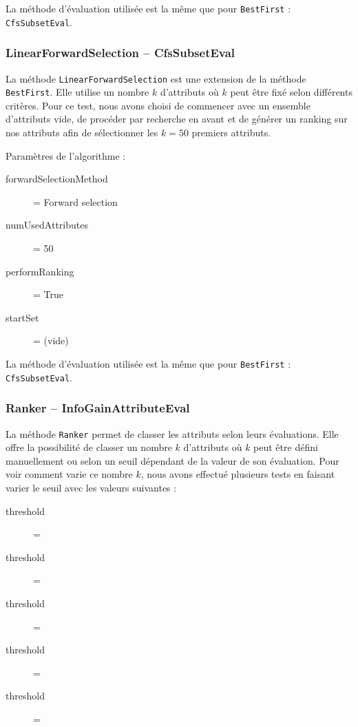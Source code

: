 La méthode d'évaluation utilisée est la même que pour \texttt{BestFirst} : \texttt{CfsSubsetEval}.

\subsubsection{LinearForwardSelection -- CfsSubsetEval}

La méthode \texttt{LinearForwardSelection} est une extension de la méthode \texttt{BestFirst}. Elle utilise un nombre $k$ d'attributs où $k$ peut être fixé selon différents critères. Pour ce test, nous avons choisi de commencer avec un ensemble d'attributs vide, de procéder par recherche en avant et de générer un \og ranking \fg{} sur nos attributs afin de sélectionner les $k=50$ premiers attributs.

Paramètres de l'algorithme :
\begin{description}
	\item[forwardSelectionMethod] = Forward selection
	\item[numUsedAttributes] = 50
	\item[performRanking] = True
	\item[startSet] = (vide)	
\end{description}

La méthode d'évaluation utilisée est la même que pour \texttt{BestFirst} : \texttt{CfsSubsetEval}.

\subsubsection{Ranker -- InfoGainAttributeEval}

La méthode \texttt{Ranker} permet de classer les attributs selon leurs évaluations. Elle offre la possibilité de classer un nombre $k$ d'attributs où $k$ peut être défini manuellement ou selon un seuil dépendant de la valeur de son évaluation. Pour voir comment varie ce nombre $k$, nous avons effectué plusieurs tests en faisant varier le seuil avec les valeurs suivantes : 

\begin{description}
	\item[threshold] = 
	\item[threshold] = 
	\item[threshold] = 
	\item[threshold] = 
	\item[threshold] = 
\end{description}

